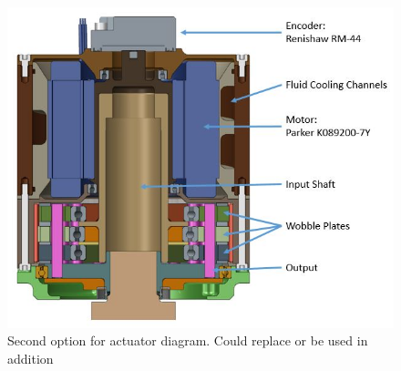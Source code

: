 \documentclass[letterpaper, 10 pt, conference]{ieeeconf}  %
\begin{document}
   \begin{figure}[!b]
      \centering
      \includegraphics[width=\linewidth]{cross_labeled}
      \caption{Second option for actuator diagram. Could replace or be used in addition}
      \label{cross_labeled}
   \end{figure}
\end{document}
